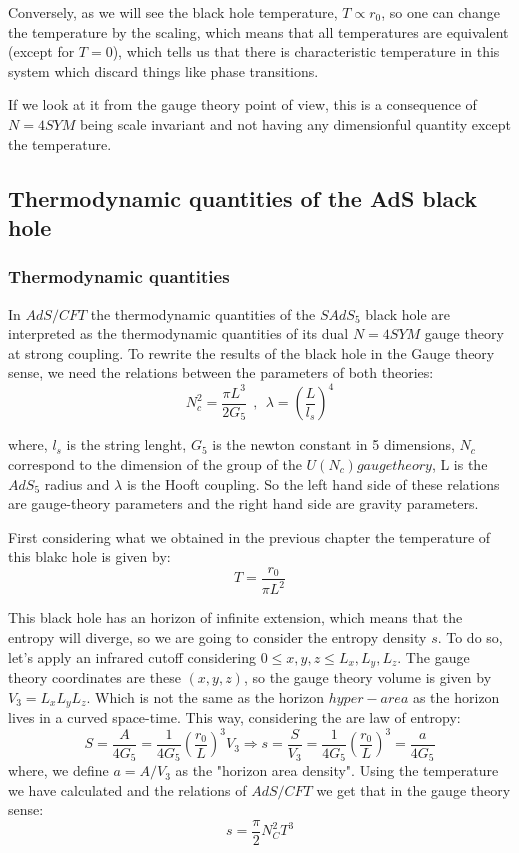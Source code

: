 \documentclass[12pt]{article}
\begin{document}
\vspace{.25cm}

Conversely, as we will see the black hole temperature, $T\propto r_0$, so one can change the temperature by the scaling, which means that all temperatures are equivalent (except for $T=0$), which tells us that there is characteristic temperature in this system which discard things like phase transitions.

\vspace{.25cm}
If we look at it from the gauge theory point of view, this is a consequence of $N=4 SYM$ being scale invariant and not having any dimensionful quantity except the temperature.

\subsection{Thermodynamic quantities of the AdS black hole}

\subsubsection{Thermodynamic quantities}

In $AdS/CFT$ the thermodynamic quantities of the $SAdS_5$ black hole are interpreted as the thermodynamic quantities of its dual $N=4 SYM$ gauge theory at strong coupling. To rewrite the results of the black hole in the Gauge theory sense, we need the relations between the parameters of both theories:
\[
    N_c^2 = \frac{\pi L^3}{2G_5} ~~,~~ \lambda = \left(\frac{L}{l_s}\right)^4
\]

where, $l_s$ is the string lenght, $G_5$ is the newton constant in 5 dimensions, $N_c$ correspond to the dimension of the group of the $U(N_c) gauge theory$, L is the $AdS_5$ radius and $\lambda$ is the Hooft coupling. So the left hand side of these relations are gauge-theory parameters and the right hand side are gravity parameters. 

\vspace{.25cm}

First considering what we obtained in the previous chapter the temperature of this blakc hole is given by:
\[
    T=\frac{r_0}{\pi L^2}
\]

This black hole has an horizon of infinite extension, which means that the entropy will diverge, so we are going to consider the entropy density $s$. To do so, let's apply an infrared cutoff considering $0\leq x,y,z\leq L_x,L_y,L_z$. The gauge theory coordinates are these $(x,y,z)$, so the gauge theory volume is given by $V_3 = L_x L_y L_z$. Which is not the same as the horizon $hyper-area$ as the horizon lives in a curved space-time. This way, considering the are law of entropy:
\[
    S=\frac{A}{4G_5} = \frac{1}{4G_5}\left(\frac{r_0}{L}\right)^3 V_3 \Rightarrow s = \frac{S}{V_3} = \frac{1}{4G_5}\left(\frac{r_0}{L}\right)^3 = \frac{a}{4G_5}
\]
where, we define $a=A/V_3$ as the "horizon area density". Using the temperature we have calculated and the relations of $AdS/CFT$ we get that in the gauge theory sense:
\[
    s=\frac{\pi}{2}N_C^2 T^3
\]
\end{document}
